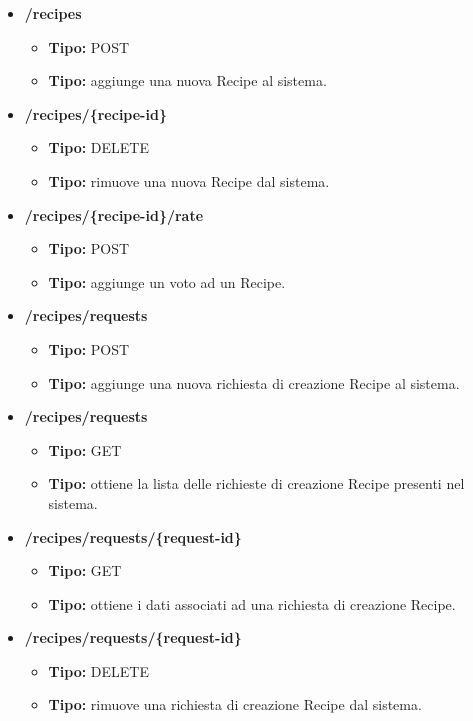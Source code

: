 \begin{itemize}
  \item \textbf{/recipes}
  \begin{itemize}
    \item \textbf{Tipo:} POST
    \item \textbf{Tipo:} aggiunge una nuova Recipe al sistema.
  \end{itemize}
  \item \textbf{/recipes/\{recipe-id\}}
  \begin{itemize}
    \item \textbf{Tipo:} DELETE
    \item \textbf{Tipo:} rimuove una nuova Recipe dal sistema.
  \end{itemize}
  \item \textbf{/recipes/\{recipe-id\}/rate}
  \begin{itemize}
    \item \textbf{Tipo:} POST
    \item \textbf{Tipo:} aggiunge un voto ad un Recipe.
  \end{itemize}


  \item \textbf{/recipes/requests}
  \begin{itemize}
    \item \textbf{Tipo:} POST
    \item \textbf{Tipo:} aggiunge una nuova richiesta di creazione Recipe al sistema.
  \end{itemize}
  \item \textbf{/recipes/requests}
  \begin{itemize}
    \item \textbf{Tipo:} GET
    \item \textbf{Tipo:} ottiene la lista delle richieste di creazione Recipe presenti nel sistema.
  \end{itemize}
  \item \textbf{/recipes/requests/\{request-id\}}
  \begin{itemize}
    \item \textbf{Tipo:} GET
    \item \textbf{Tipo:} ottiene i dati associati ad una richiesta di creazione Recipe.
  \end{itemize}
  \item \textbf{/recipes/requests/\{request-id\}}
  \begin{itemize}
    \item \textbf{Tipo:} DELETE
    \item \textbf{Tipo:} rimuove una richiesta di creazione Recipe dal sistema.
  \end{itemize}

\end{itemize}
